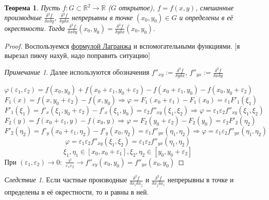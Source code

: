 \documentclass[a4paper]{article}
\theoremstyle{indented}
\newtheorem{theorem}{Теорема}
\theoremstyle{definition}
\theoremstyle{remark}
\newtheorem{remark}{Примечание}
\newtheorem{cons}{Следствие}
\begin{document}
\begin{theorem}
    Пусть $f: G\subset \mathbb{R}^2 \to \mathbb{R}$ ($G$ открытое), $f=f(x,y)$,
    смешанные производные $\frac{\delta^2 f}{\delta x \delta y}$,
    $\frac{\delta^2 f}{\delta y \delta x}$ непрерывны в точке $(x_0,y_0)\in G$ и определены в её окрестности.
    Тогда $\frac{\delta^2 f}{\delta x \delta y} (x_0,y_0) = \frac{\delta^2 f}{\delta y \delta x} (x_0,y_0)$.
\end{theorem}

\begin{proof}
    Воспользуемся \hyperlink{lagrange}{формулой Лагранжа} и вспомогательными функциями. [я вырезал пикчу нахуй, надо поправить ситуацию]
    

    \begin{remark}
        Далее используются обозначения
        $f''_{xy}:=\frac{\delta^2 f}{\delta y \delta x}$,
        $f''_{yx}:=\frac{\delta^2 f}{\delta x \delta y}$
    \end{remark}

    \[\varphi(\varepsilon_1, \varepsilon_2) =
        f(x_0, y_0)+f(x_0+\varepsilon_1, y_0+\varepsilon_2)
        -f(x_0+\varepsilon_1, y_0)-f(x_0, y_0+\varepsilon_2)\]
    \[F_1(x)=f(x,y_0+\varepsilon_2)-f(x,y_0)
        \Rightarrow \varphi = F_1(x_0+\varepsilon_1)-F_1(x_0) = \varepsilon_1 F'_1(\xi_1)\]
    \[F'_1(\xi_1)=f'_x(\xi _1, y_0+\varepsilon_2)-f'_x(\xi_1,y_0)=
        \varepsilon_2 f''_{xy}(\xi_1, \xi_2)
        \Rightarrow \varphi = \varepsilon_1 \varepsilon_2 f''_{xy}(\xi_1, \xi_2)\]
    \[F_2(y)=f(x_0+\varepsilon_1,y)-f(x_0,y)
        \Rightarrow \varphi = F_2(y_0+\varepsilon_2)-F_2(y_0) = \varepsilon_2 F'_2(\eta_2)\]
    \[F'_2(\eta_2)=f'_y(x_0+\varepsilon_1,\eta_2)-f'_y(x_0,\eta_2)=
        \varepsilon_1 f''_{yx}(\eta_1, \eta_2)
        \Rightarrow \varphi = \varepsilon_1 \varepsilon_2 f''_{yx}(\eta_1, \eta_2)\]
    \[\varphi = \varepsilon_1 \varepsilon_2 f''_{xy}(\xi_1, \xi_2) = \varepsilon_1 \varepsilon_2 f''_{yx}(\eta _1, \eta _2) \]
    \[\xi_1,\eta_1 \in [x_0, x_0+\varepsilon_1], \xi_2,\eta_2 \in [y_0, y_0+\varepsilon_2]\]
    При $(\varepsilon_1, \varepsilon_2) \to 0:$
    $\frac{\varphi}{\varepsilon_1 \varepsilon_2} \to f''_{xy}(x_0, y_0) = f''_{yx}(x_0, y_0)$
\end{proof}

\begin{cons}
    Если частные производные $\frac{\delta^2 f}{\delta x_i \delta x_j}$ и $\frac{\delta^2 f}{\delta x_j \delta x_i}$ непрерывны в точке и определены в её окрестности, то и равны в ней.
\end{cons}
\end{document}
